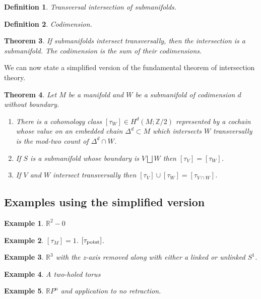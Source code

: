 \documentclass{amsart}          %
\newcommand{\Z}{{\mathbb{Z}}}
\newtheorem{theorem}{Theorem}
\newtheorem{definition}[theorem]{Definition}
\newtheorem{example}{Example}
\newcommand{\R}{\mathbb R}
\begin{document}
\begin{definition}
Transversal intersection of submanifolds.
\end{definition}

\begin{definition}
Codimension.
\end{definition}

\begin{theorem}
If submanifolds intersect transversally, then the intersection is a submanifold.  The codimension is the sum of their codimensions.
\end{theorem}

We can now state a simplified version of the fundamental theorem of intersection theory.

\begin{theorem}
Let $M$ be a manifold and $W$ be a submanifold of codimension $d$ without boundary.  
\begin{enumerate}
\item There is a cohomology class $[\tau_{W}] \in H^{d}(M; \Z/2)$ represented by a cochain whose value on an embedded chain $\Delta^{d} \subset M$ which intersects $W$ transversally is the mod-two count of $\Delta^{d} \cap W$.
\item If $S$ is a submanifold whose boundary is $V \bigsqcup W$ then $[\tau_{V}] = [\tau_{W}]$.
\item If $V$ and $W$ intersect transversally then $[\tau_{V}] \cup [\tau_{W}] = [\tau_{V \cap W}]$.
\end{enumerate}
\end{theorem}

\subsection{Examples using the simplified version}
\begin{example}
$\R^{2} - 0$
\end{example}
\begin{example}
$[\tau_M] = 1$.  $[\tau_{{\rm point}}]$.
\end{example}
\begin{example}
$\R^{3}$ with the z-axis removed along with either a linked or unlinked $S^{1}$.
\end{example}
\begin{example}
A two-holed torus
\end{example}
\begin{example}
$\R P^{n}$ and application to no retraction.
\end{example}
\end{document}
